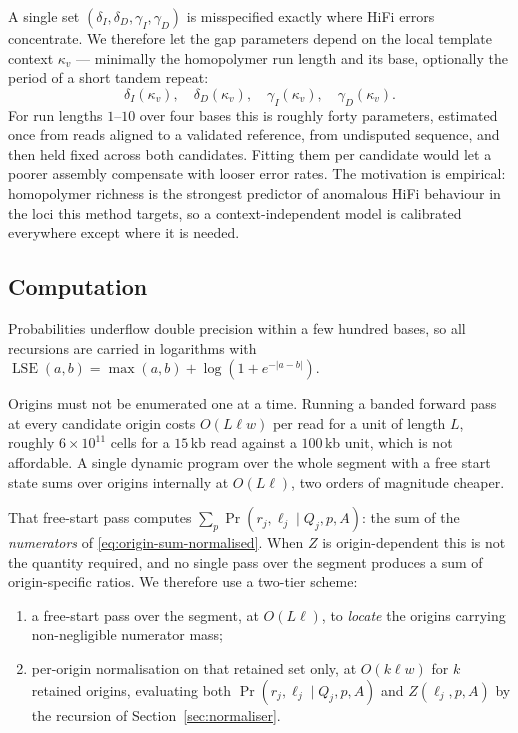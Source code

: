 \documentclass[11pt]{article}
\DeclareMathOperator{\LSE}{LSE}
\newcommand{\Prob}{\Pr}
\begin{document}
A single set $(\delta_I,\delta_D,\gamma_I,\gamma_D)$ is misspecified exactly
where HiFi errors concentrate.  We therefore let the gap parameters depend on
the local template context $\kappa_v$ --- minimally the homopolymer run length
and its base, optionally the period of a short tandem repeat:
\begin{equation}
    \delta_I(\kappa_v),\quad \delta_D(\kappa_v),\quad
    \gamma_I(\kappa_v),\quad \gamma_D(\kappa_v).
\end{equation}
For run lengths $1$--$10$ over four bases this is roughly forty parameters,
estimated once from reads aligned to a validated reference, from undisputed
sequence, and then held fixed across both candidates.  Fitting them per
candidate would let a poorer assembly compensate with looser error rates.  The
motivation is empirical: homopolymer richness is the strongest predictor of
anomalous HiFi behaviour in the loci this method targets, so a
context-independent model is calibrated everywhere except where it is needed.

\subsection{Computation}
\label{sec:computation}

Probabilities underflow double precision within a few hundred bases, so all
recursions are carried in logarithms with
$\LSE(a,b) = \max(a,b) + \log(1+e^{-|a-b|})$.

Origins must not be enumerated one at a time.  Running a banded forward pass at
every candidate origin costs $O(L\ell w)$ per read for a unit of length $L$,
roughly $6\times10^{11}$ cells for a $15$\,kb read against a $100$\,kb unit,
which is not affordable.  A single dynamic program over the whole segment with
a free start state sums over origins internally at $O(L\ell)$, two orders of
magnitude cheaper.

That free-start pass computes $\sum_p \Prob(r_j,\ell_j\mid Q_j,p,A)$: the sum
of the \emph{numerators} of \eqref{eq:origin-sum-normalised}.  When $Z$ is
origin-dependent this is not the quantity required, and no single pass over the
segment produces a sum of origin-specific ratios.  We therefore use a two-tier
scheme:

\begin{enumerate}
    \item a free-start pass over the segment, at $O(L\ell)$, to \emph{locate}
          the origins carrying non-negligible numerator mass;
    \item per-origin normalisation on that retained set only, at
          $O(k\ell w)$ for $k$ retained origins, evaluating both
          $\Prob(r_j,\ell_j\mid Q_j,p,A)$ and $Z(\ell_j,p,A)$ by the recursion
          of Section~\ref{sec:normaliser}.
\end{enumerate}
\end{document}
